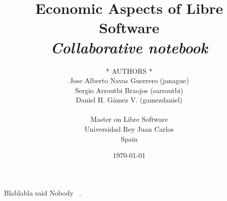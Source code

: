 \documentclass[10pt,a4paper,final]{report}
\title{\textbf{Economic Aspects of Libre Software}\\
		\emph{Collaborative notebook}}
\author{* AUTHORS *\\
		Jose Alberto Navas Guerrero (janague)\\
		Sergio Arroutbi Braojos (sarroutbi)\\
		Daniel H. G\'amez V. (gamezdaniel)\\
        \\Master on Libre Software\\
        Universidad Rey Juan Carlos\\
        Spain	\\
		}
\date{\today}
\begin{document}
\maketitle



\tableofcontents










Blablabla said Nobody ~\cite{Nobody06}.




\end{document}
